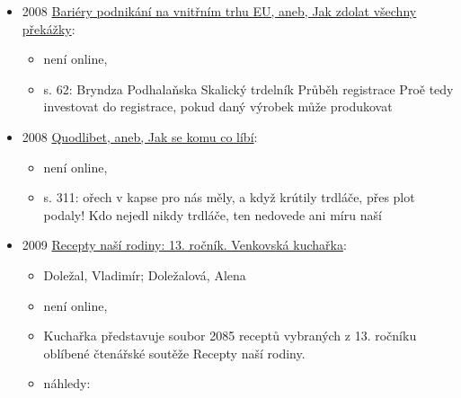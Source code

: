 \begin{itemize}
\begin{itemize}
    \begin{itemize}
    \tightlist
    \item
      popisuje přípravu těsta a pečení, po opečení obalí kokosem,
      skořicí, vanilce nebo oříškách
    \end{itemize}
  \item
    s. 120: požitku. Trdelníky mohou být pochopitelně i delší, ve
    Skalici upekli trdelník dlouhý 154 a půl centimetru. Kdysi se toto

    \begin{itemize}
    \tightlist
    \item
      popisuje, že trdelníky se dělaly ke slavnostním příležitostem a že
      si dělali lidi i doma menší trubičky, ale z kynutýho těsta
    \end{itemize}
  \item
    s. 121: Pečený trdelník Z dostupných zdrojů lze najít několik
    podobných receptů, mezi Moravou a Slovenskem jsem našel
  \end{itemize}
\item
  2008
  \href{https://www.digitalniknihovna.cz/mzk/uuid/uuid:c8af66d0-b8d5-11e3-9d7d-005056827e51}{Bariéry
  podnikání na vnitřním trhu EU, aneb, Jak zdolat všechny překážky}:

  \begin{itemize}
  \tightlist
  \item
    není online, 
  \item
    s. 62: Bryndza Podhalaňska Skalický trdelník Průběh registrace Proě
    tedy investovat do registrace, pokud daný výrobek může produkovat
  \end{itemize}
\item
  2008
  \href{https://ceskadigitalniknihovna.cz/uuid/uuid:7df5ae70-0224-11e6-845a-005056827e51}{Quodlibet,
  aneb, Jak se komu co líbí}:

  \begin{itemize}
  \tightlist
  \item
    není online, 
  \item
    s. 311: ořech v kapse pro nás měly, a když krútily trdláče, přes
    plot podaly! Kdo nejedl nikdy trdláče, ten nedovede ani míru naší
  \end{itemize}
\item
  2009
  \href{https://ceskadigitalniknihovna.cz/uuid/uuid:33331cf0-d935-11e5-a3e0-005056827e51}{Recepty
  naší rodiny: 13. ročník. Venkovská kuchařka}:

  \begin{itemize}
  \tightlist
  \item
    Doležal, Vladimír; Doležalová, Alena
  \item
    není online, 
  \item
    Kuchařka představuje soubor 2085 receptů vybraných z 13. ročníku
    oblíbené čtenářské soutěže Recepty naší rodiny.
  \item
    náhledy:


\end{itemize}
\end{itemize}
